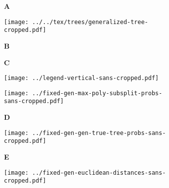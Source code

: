 \documentclass[border=10pt,varwidth=30cm]{standalone}
\begin{document}
\begin{figure}
    \centering
    \begin{subfigure}[b][][l]{\textwidth}
        \huge \textbf{A}
    \end{subfigure}
    \begin{subfigure}[c][][c]{\textwidth}
        \centering
        \texttt{[image: ../../tex/trees/generalized-tree-cropped.pdf]}
        \label{fig:gentree}
    \end{subfigure}
    \begin{subfigure}[b][][l]{0.34\textwidth}
        \huge \textbf{B}
    \end{subfigure}
    \hfill
    \begin{subfigure}[b][][l]{0.64\textwidth}
        \huge \textbf{C}
    \end{subfigure}
    \begin{subfigure}[c][][c]{0.34\textwidth}
        \centering
        \texttt{[image: ../legend-vertical-sans-cropped.pdf]}
    \end{subfigure}
    \hfill
    \begin{subfigure}[c][][c]{0.64\textwidth}
        \centering
        \texttt{[image: ../fixed-gen-max-poly-subsplit-probs-sans-cropped.pdf]}
    \end{subfigure}
    \begin{subfigure}[b][][l]{\textwidth}
        \huge \textbf{D}
    \end{subfigure}
    \begin{subfigure}[c][][c]{1\textwidth}
        \centering
        \texttt{[image: ../fixed-gen-gen-true-tree-probs-sans-cropped.pdf]}
    \end{subfigure}
    \begin{subfigure}[b][][l]{\textwidth}
        \huge \textbf{E}
    \end{subfigure}
    \begin{subfigure}[c][][c]{1\textwidth}
        \centering
        \texttt{[image: ../fixed-gen-euclidean-distances-sans-cropped.pdf]}
    \end{subfigure}
\end{figure}
\end{document}
